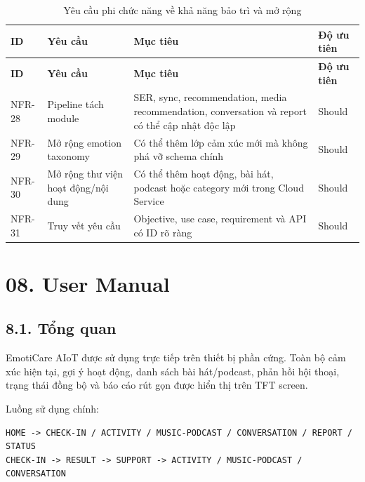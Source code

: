 \documentclass[12pt,a4paper]{article}
\begin{document}
\begin{center}
\scriptsize
\begin{longtable}{|P{0.13\textwidth}|P{0.25\textwidth}|P{0.38\textwidth}|P{0.14\textwidth}|}
\caption{Yêu cầu phi chức năng về khả năng bảo trì và mở rộng}\\
\hline
\textbf{ID} & \textbf{Yêu cầu} & \textbf{Mục tiêu} & \textbf{Độ ưu tiên} \\
\hline
\endfirsthead
\hline
\textbf{ID} & \textbf{Yêu cầu} & \textbf{Mục tiêu} & \textbf{Độ ưu tiên} \\
\hline
\endhead
NFR-28 & Pipeline tách module & SER, sync, recommendation, media recommendation, conversation và report có thể cập nhật độc lập & Should \\
\hline
NFR-29 & Mở rộng emotion taxonomy & Có thể thêm lớp cảm xúc mới mà không phá vỡ schema chính & Should \\
\hline
NFR-30 & Mở rộng thư viện hoạt động/nội dung & Có thể thêm hoạt động, bài hát, podcast hoặc category mới trong Cloud Service & Should \\
\hline
NFR-31 & Truy vết yêu cầu & Objective, use case, requirement và API có ID rõ ràng & Should \\
\hline
\end{longtable}
\normalsize
\end{center}


\FloatBarrier

\clearpage
\section*{08. User Manual}

\subsection*{8.1. Tổng quan}

EmotiCare AIoT được sử dụng trực tiếp trên thiết bị phần cứng. Toàn bộ cảm xúc hiện tại, gợi ý hoạt động, danh sách bài hát/podcast, phản hồi hội thoại, trạng thái đồng bộ và báo cáo rút gọn được hiển thị trên TFT screen.


Luồng sử dụng chính:


\begin{verbatim}
HOME -> CHECK-IN / ACTIVITY / MUSIC-PODCAST / CONVERSATION / REPORT / STATUS
CHECK-IN -> RESULT -> SUPPORT -> ACTIVITY / MUSIC-PODCAST / CONVERSATION
\end{verbatim}
\end{document}
